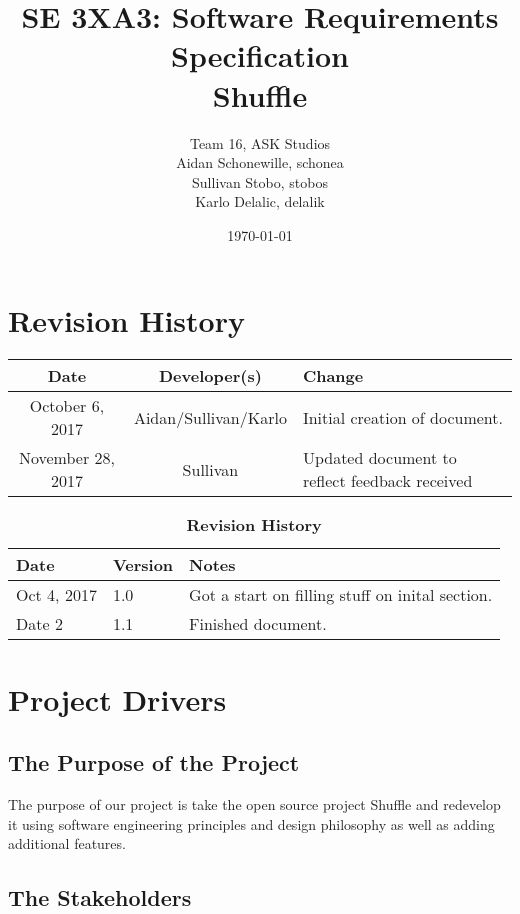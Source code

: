 \documentclass[12pt, titlepage]{article}
\title{SE 3XA3: Software Requirements Specification\\Shuffle}
\author{Team 16, ASK Studios
    \\ Aidan Schonewille, schonea
    \\ Sullivan Stobo, stobos
    \\ Karlo Delalic, delalik
}
\date{\today}
\begin{document}
\section*{Revision History}
\begin{center}
\begin{tabular}{| c | c | p{6cm} |}
\hline
\textbf{Date} & \textbf{Developer(s)} & \textbf{Change}\\
\hline
October 6, 2017 & Aidan/Sullivan/Karlo & Initial creation of document.\\
\hline
November 28, 2017 & Sullivan & Updated document to reflect feedback received \\
\hline
\end{tabular}
\end{center}

\maketitle

\tableofcontents
\listoftables
\listoffigures

\begin{table}[bp]
\caption{\bf Revision History}
\begin{tabularx}{\textwidth}{p{3cm}p{2cm}X}
\toprule {\bf Date} & {\bf Version} & {\bf Notes}\\
\midrule
Oct 4, 2017 & 1.0 & Got a start on filling stuff on inital section.\\
Date 2 & 1.1 & Finished document.\\
\bottomrule
\end{tabularx}
\end{table}

\newpage


\section{Project Drivers}

\subsection{The Purpose of the Project}

The purpose of our project is take the open source project Shuffle and redevelop it using software engineering principles and design philosophy as well as adding additional features.  

\subsection{The Stakeholders}
\end{document}
